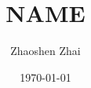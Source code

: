\documentclass{amsart}
\begin{document}
    \title{NAME}
    \author{Zhaoshen Zhai}
    \date{\today}
    \maketitle
\end{document}
